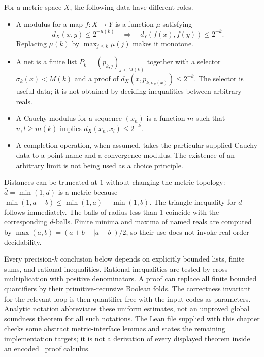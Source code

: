 For a metric space $X$, the following data have different roles.
\begin{itemize}
\item A modulus for a map $f:X\to Y$ is a function $\mu$ satisfying
\begin{equation}\label{eq:metric-modulus}
d_X(x,y)\leq 2^{-\mu(k)}\quad\Longrightarrow\quad
 d_Y(f(x),f(y))\leq 2^{-k}.
\end{equation}
Replacing $\mu(k)$ by $\max_{j\leq k}\mu(j)$ makes it monotone.
\item A net is a finite list $P_k=(p_{k,j})_{j<M(k)}$ together with a
selector $\sigma_k(x)<M(k)$ and a proof of
$d_X(x,p_{k,\sigma_k(x)})\leq 2^{-k}$.  The selector is useful data;
it is not obtained by deciding inequalities between arbitrary reals.
\item A Cauchy modulus for a sequence $(x_n)$ is a function $m$ such that
$n,l\geq m(k)$ implies $d_X(x_n,x_l)\leq 2^{-k}$.
\item A completion operation, when assumed, takes the particular supplied
Cauchy data to a point name and a convergence modulus.  The existence of
an arbitrary limit is not being used as a choice principle.
\end{itemize}
Distances can be truncated at $1$ without changing the metric topology:
$\bar d=\min(1,d)$ is a metric because
$\min(1,a+b)\leq\min(1,a)+\min(1,b)$.  The triangle inequality for
$\bar d$ follows immediately.  The balls of radius less than $1$ coincide
with the corresponding $d$-balls.  Finite minima and maxima of named reals
are computed by $\max(a,b)=(a+b+|a-b|)/2$, so their use does not invoke
real-order decidability.

\begin{remark}\label{rem:metric-finite-demand}
Every precision-$k$ conclusion below depends on explicitly bounded lists,
finite sums, and rational inequalities.  Rational inequalities are tested
by cross multiplication with positive denominators.  A proof can replace
all finite bounded quantifiers by their primitive-recursive Boolean folds.
The correctness invariant for the relevant loop is then quantifier free
with the input codes as parameters.  Analytic notation abbreviates these
uniform estimates, not an unproved global soundness theorem for all such
notations.  The Lean file supplied with this chapter checks some abstract
metric-interface lemmas and states the remaining implementation targets;
it is not a derivation of every displayed theorem inside an encoded
\ipra\ proof calculus.
\end{remark}

